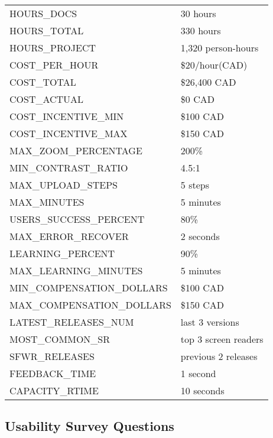 \documentclass[12pt, titlepage]{article}
\begin{document}
\begin{longtable}{|p{8.0cm}|p{8.0cm}|}
  HOURS\_DOCS & 30 hours \\
  HOURS\_TOTAL & 330 hours \\
  HOURS\_PROJECT & 1,320 person-hours \\
  COST\_PER\_HOUR & \$20/hour(CAD) \\
  COST\_TOTAL & \$26,400 CAD \\
  COST\_ACTUAL & \$0 CAD \\
  COST\_INCENTIVE\_MIN & \$100 CAD \\
  COST\_INCENTIVE\_MAX & \$150 CAD \\
  MAX\_ZOOM\_PERCENTAGE & 200\% \\
  MIN\_CONTRAST\_RATIO & 4.5:1\\
  MAX\_UPLOAD\_STEPS & 5 steps\\
  MAX\_MINUTES & 5 minutes\\
  USERS\_SUCCESS\_PERCENT & 80\%\\
  MAX\_ERROR\_RECOVER & 2 seconds \\
  LEARNING\_PERCENT & 90\% \\
  MAX\_LEARNING\_MINUTES & 5 minutes \\
  MIN\_COMPENSATION\_DOLLARS & \$100 CAD \\
  MAX\_COMPENSATION\_DOLLARS & \$150 CAD \\
  LATEST\_RELEASES\_NUM & last 3 versions \\
  MOST\_COMMON\_SR & top 3 screen readers \\
  SFWR\_RELEASES & previous 2 releases \\
  FEEDBACK\_TIME & 1 second \\
  CAPACITY\_RTIME & 10 seconds \\

\bottomrule
\end{longtable}

\subsection{Usability Survey Questions}
\label{appendix:usability}
\end{document}
